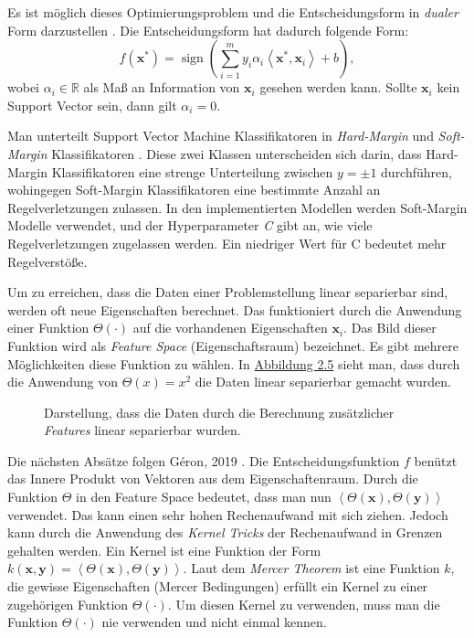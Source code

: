 Es ist m\"oglich dieses Optimierungsproblem und die Entscheidungsform in \textit{dualer} Form darzustellen \cite[Seite 168]{handson}. Die Entscheidungsform hat dadurch folgende Form:
$$ f(\mathbf{x^*}) = \operatorname{sign}(\sum_{i=1}^m y_i\alpha_i \left\langle \mathbf{x^*}, \mathbf{x}_i \right\rangle + b), $$
wobei $\alpha_i \in \mathbb{R}$ als Ma{\ss} an Information von $\mathbf{x}_i$ gesehen werden kann. Sollte $\mathbf{x}_i$ kein Support Vector sein, dann gilt $\alpha_i = 0$.

Man unterteilt Support Vector Machine Klassifikatoren in \textit{Hard-Margin} und \textit{Soft-Margin} Klassifikatoren \cite[Kapitel 15]{shalev}. Diese zwei Klassen
unterscheiden sich darin, dass Hard-Margin Klassifikatoren eine strenge Unterteilung zwischen $y = \pm1$ durchf\"uhren, wohingegen Soft-Margin
Klassifikatoren eine bestimmte Anzahl an Regelverletzungen zulassen. In den implementierten Modellen werden Soft-Margin Modelle verwendet, und der
Hyperparameter \textit{C} gibt an, wie viele Regelverletzungen zugelassen werden. Ein niedriger Wert f\"ur C bedeutet mehr Regelverst\"o{\ss}e.

Um zu erreichen, dass die Daten einer Problemstellung linear separierbar sind, werden oft neue Eigenschaften berechnet. Das funktioniert durch die
Anwendung einer Funktion $\Theta(\cdot)$ auf die vorhandenen Eigenschaften $\mathbf{x}_i$. Das Bild dieser Funktion wird als \textit{Feature Space} (Eigenschaftsraum) bezeichnet.
Es gibt mehrere M\"oglichkeiten diese Funktion zu w\"ahlen. In
\hyperref[fig:svm2]{Abbildung 2.5} sieht man, dass durch die Anwendung von $\Theta(x) = x^2$ die Daten linear separierbar gemacht wurden.

\begin{figure}[ht]
	\label{fig:svm2}
	\begin{center}
		\begin{tiny}
		\end{tiny}
	\end{center}
	\caption[Berechnung zus\"atzlicher Features aus vorhandenen Inputs]
	{Darstellung, dass die Daten durch die Berechnung zus\"atzlicher \textit{Features} linear separierbar wurden.}
\end{figure}

Die n\"achsten Abs\"atze folgen Géron, 2019 \cite[Kapitel 5]{handson}. Die Entscheidungsfunktion $f$ ben\"utzt das Innere Produkt von Vektoren aus dem Eigenschaftenraum. Durch die Funktion $\Theta$ in den
Feature Space bedeutet, dass man nun $\left\langle \Theta(\mathbf{x}), \Theta(\mathbf{y}) \right\rangle$ verwendet. Das kann einen sehr hohen Rechenaufwand
mit sich ziehen. Jedoch kann durch die Anwendung des \textit{Kernel Tricks} der Rechenaufwand in Grenzen gehalten werden. Ein Kernel ist eine Funktion
der Form $k(\mathbf{x}, \mathbf{y}) = \left\langle \Theta(\mathbf{x}), \Theta(\mathbf{y}) \right\rangle$. Laut dem \textit{Mercer Theorem} ist eine Funktion
$k$, die gewisse Eigenschaften (Mercer Bedingungen) erf\"ullt ein Kernel zu einer zugeh\"origen Funktion $\Theta(\cdot)$. Um
diesen Kernel zu verwenden, muss man die Funktion $\Theta(\cdot)$ nie verwenden und nicht einmal kennen.

